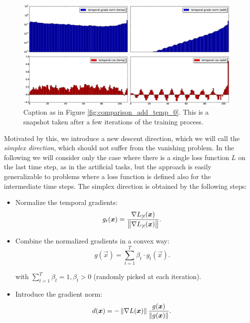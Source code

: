 \begin{figure}[h]
	\includegraphics[width=1\textwidth]{chapter3/compare_add_temp_norms_1.eps}
	\caption{Caption as in Figure \ref{fig:comparison_add_temp_0}. This is a snapshot taken after a few iterations of the training process.}
	\label{fig:comparison_add_temp_1}
\end{figure}


Motivated by this, we introduce a new descent direction, which we will call the \textit{simplex direction},
which should not suffer from the vanishing problem. In the following we will consider only the case where there is a single loss function $L$ on the last time step, as in the artificial tasks, but the approach is easily generalizable to problems where a loss function is defined also for the intermediate time steps. The simplex direction is obtained by the following steps:


\begin{itemize}
	\item Normalize the temporal gradients:
	\begin{equation}
	g_t(\boldsymbol{x}) = \frac{\nabla L_{|t}(\boldsymbol{x})}{\left\Vert \nabla L_{|t}(\boldsymbol{x}) \right\Vert}.
	\end{equation}
	
	\item Combine the normalized gradients in a convex way:
	\begin{equation}
	g(\vec{x}) = \sum_{t=1}^T \beta_t \cdot g_t(\vec{x}).
	\end{equation}
	
	with $\sum_{t=1}^T\beta_t=1, \beta_t>0$ (randomly picked at each iteration).
	\item Introduce the gradient norm:
	\begin{equation}
	d(\boldsymbol{x}) = - \left\Vert \nabla L (\boldsymbol{x}) \right\Vert\frac{g(\boldsymbol{x})}{\left\Vert g(\boldsymbol{x}) \right\Vert}.
	\end{equation}
\end{itemize}

